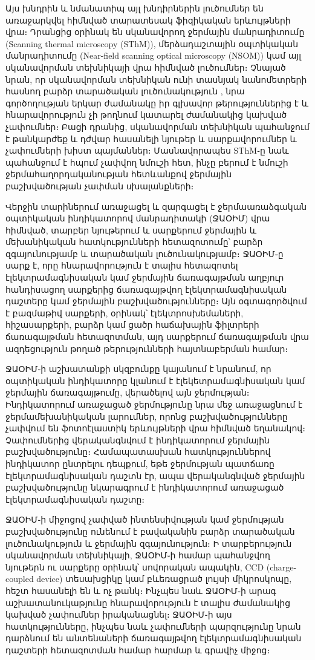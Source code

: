 \documentclass[12pt, fleqn]{report}
\begin{document}
Այս խնդրին և նմանատիպ այլ խնդիրներին լուծումներ են առաջարկվել հիմնված տարատեսակ ֆիզիկական երևույթների վրա։ Դրանցից օրինակ են սկանավորող ջերմային մանրադիտումը (Scanning thermal microscopy (SThM)), մերձադաշտային օպտիկական մանրադիտումը (Near-field scanning optical microscopy (NSOM)) կամ այլ սկանավորման տեխնիկայի վրա հիմնված լուծումներ։ Չնայած նրան, որ սկանավորման տեխնիկան ունի տասնյակ նանոմետրերի հասնող բարձր տարածական լուծունակություն \cite{yue2012nanoscalethermal}, նրա գործողության երկար ժամանակը իր գլխավոր թերություններից է և հնարավորություն չի թողնում կատարել ժամանակից կախված չափումներ։ Բացի դրանից, սկանավորման տեխնիկան պահանջում է թանկարժեք և դժվար հասանելի նյութեր և սարքավորումներ և չափումների խիստ պայմաններ։ Մասնավորապես SThM֊ը նաև պահանջում է հպում չափվող նմուշի հետ, ինչը բերում է նմուշի ջերմահաղորդականության հետևանքով ջերմային բաշխվածության չափման սխալանքների։

Վերջին տարիներում առաջացել և զարգացել է ջերմաառաձգական օպտիկական ինդիկատորով մանրադիտակի (ՋԱՕԻՄ) վրա հիմնված, տարբեր նյութերում և սարքերում ջերմային և մեխանիկական հատկությունների հետազոտումը՝  բարձր զգայունությամբ և տարածական լուծունակությամբ։ ՋԱՕԻՄ֊ը սարք է, որը հնարավորություն է տալիս հետազոտել էլեկտրամագնիսական կամ ջերմային ճառագայթման աղբյուր հանդիսացող սարքերից ճառագայթվող էլեկտրամագնիսական դաշտերը կամ ջերմային բաշխվածությունները։ Այն օգտագործվում է բազմաթիվ սարքերի, օրինակ՝ էլեկտրոսխեմաների, հիշասարքերի, բարձր կամ ցածր հաճախային ֆիլտրերի ճառագայթման հետազոտման, այդ սարքերում  ճառագայթման վրա ազդեցություն թողած թերությունների հայտնաբերման համար։

ՋԱՕԻՄ֊ի աշխատանքի սկզբունքը կայանում է նրանում, որ օպտիկական ինդիկատորը կլանում է էլեկետրամագնիսական կամ ջերմային ճառագայթումը, վերածելով այն ջերմության։ Ինդիկատորում առաջացած ջերմությունը նրա մեջ առաջացնում է ջերմամեխանիկական լարումներ, որոնց բաշխվածությունները չափվում են ֆոտոէլաստիկ երևույթների վրա հիմնված եղանակով։ Չափումներից վերականգնվում է ինդիկատորում ջերմային բաշխվածությունը։ Համապատասխան հատկություններով ինդիկատոր ընտրելու դեպքում, եթե ջերմության պատճառը էլեկտրամագնիսական դաշտն էր, ապա վերականգնված ջերմային բաշխվածությունը նկարագրում է ինդիկատորում առաջացած էլեկտրամագնիսական դաշտը։

ՋԱՕԻՄ֊ի միջոցով չափված ինտենսիվության կամ ջերմության բաշխվածությունը ունենում է բավականին բարձր տարածական լուծունակություն և ջերմային զգայունություն։ Ի տարբերություն սկանավորման տեխնիկայի, ՋԱՕԻՄ֊ի համար պահանջվող նյութերն ու սարքերը օրինակ՝ սովորական ապակին, CCD (charge-coupled device) տեսախցիկը կամ բևեռացրած լույսի միկրոսկոպը, հեշտ հասանելի են և ոչ թանկ։ Ինչպես նաև ՋԱՕԻՄ֊ի արագ աշխատանուկաթյունը հնարավորություն է տալիս ժամանակից կախված չափումներ իրականացնել։ ՋԱՕԻՄ֊ի այս հատկությունները, ինչպես նաև չափումների պարզությունը նրան դարձնում են անտենաների ճառագայթվող էլեկտրամագնիսական դաշտերի հետազոտման համար հարմար և գրավիչ միջոց։
\end{document}
